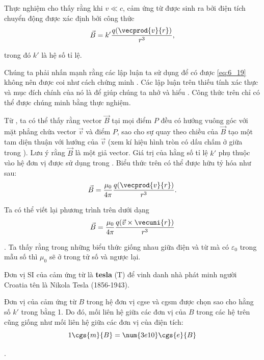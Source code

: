 Thực nghiệm cho thấy rằng khi $v\ll c$, cảm ứng từ được sinh ra bởi điện tích chuyển động được xác định bởi công thức
\begin{equation}\label{eq:6_20}
    \vec{B} = k' \frac{q (\vecprod{v}{r})}{r^3},
\end{equation}

\noindent
trong đó $k'$ là hệ số tỉ lệ.

Chúng ta phải nhấn mạnh rằng các lập luận ta sử dụng để có được \eqref{eq:6_19} không nên được coi như cách chứng minh . Các lập luận trên thiếu tính xác thực và mục đích chính của nó là để giúp chúng ta nhớ và hiểu . Công thức trên chỉ có thể được chúng minh bằng thực nghiệm.

Từ , ta có thể thấy rằng vector $\vec{B}$ tại mọi điểm $P$ đều có hướng vuông góc với mặt phẳng chứa vector $\vec{v}$ và điểm $P$, sao cho sự quay theo chiều của $\vec{B}$ tạo một tam diện thuận với hướng của $\vec{v}$ (xem kí hiệu hình tròn có dấu chấm ở giữa trong ). Lưu ý rằng $\vec{B}$ là một giả vector. Giá trị của hằng số tỉ lệ $k'$ phụ thuộc vào hệ đơn vị được sử dụng trong . Biểu thức trên có thể được hữu tỷ hóa như sau:
\begin{equation}\label{eq:6_21}
    \vec{B} = \frac{\mu_0}{4\pi} \frac{q (\vecprod{v}{r})}{r^3}.
\end{equation}

\noindent
Ta có thể viết lại phương trình trên dưới dạng
\begin{equation}\label{eq:6_22}
    \vec{B} = \frac{\mu_0}{4\pi} \frac{q (\vec{v}\times\vecuni{r})}{r^3}
\end{equation}

. Ta thấy rằng trong những biểu thức giống nhau giữa điện và từ mà có $\varepsilon_0$ trong mẫu số thì $\mu_0$ sẽ ở trong tử số và ngược lại.

Đơn vị SI của cảm ứng từ là \textbf{tesla} (\si{\tesla}) để vinh danh nhà phát minh người Croatia tên là Nikola Tesla (1856-1943).

Đơn vị của cảm ứng từ $B$ trong hệ đơn vị cgse và cgsm được chọn sao cho hằng số $k'$ trong  bằng 1. Do đó, mối liên hệ giữa các đơn vị của $B$ trong các hệ trên cũng giống như mối liên hệ giữa các đơn vị của điện tích:
\begin{equation}\label{eq:6_23}
    1 \cgs{m}{B} = \num{3e10} \cgs{e}{B}
\end{equation}

.

